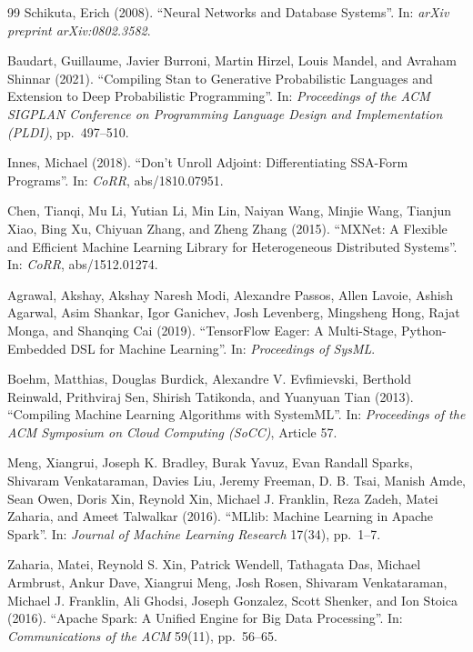 \documentclass[12pt]{report}
\begin{document}
\begin{thebibliography}{99}
Schikuta, Erich (2008).
``Neural Networks and Database Systems''.
In: \textit{arXiv preprint arXiv:0802.3582}.

Baudart, Guillaume, Javier Burroni, Martin Hirzel,
Louis Mandel, and Avraham Shinnar (2021).
``Compiling Stan to Generative Probabilistic Languages and Extension to Deep Probabilistic Programming''.
In: \textit{Proceedings of the ACM SIGPLAN Conference on Programming Language Design and Implementation (PLDI)},
pp.~497--510.

Innes, Michael (2018).
``Don't Unroll Adjoint: Differentiating SSA-Form Programs''.
In: \textit{CoRR}, abs/1810.07951.

Chen, Tianqi, Mu Li, Yutian Li, Min Lin,
Naiyan Wang, Minjie Wang, Tianjun Xiao,
Bing Xu, Chiyuan Zhang, and Zheng Zhang (2015).
``MXNet: A Flexible and Efficient Machine Learning Library for Heterogeneous Distributed Systems''.
In: \textit{CoRR}, abs/1512.01274.

Agrawal, Akshay, Akshay Naresh Modi,
Alexandre Passos, Allen Lavoie,
Ashish Agarwal, Asim Shankar,
Igor Ganichev, Josh Levenberg,
Mingsheng Hong, Rajat Monga,
and Shanqing Cai (2019).
``TensorFlow Eager: A Multi-Stage, Python-Embedded DSL for Machine Learning''.
In: \textit{Proceedings of SysML}.

Boehm, Matthias, Douglas Burdick,
Alexandre V. Evfimievski, Berthold Reinwald,
Prithviraj Sen, Shirish Tatikonda,
and Yuanyuan Tian (2013).
``Compiling Machine Learning Algorithms with SystemML''.
In: \textit{Proceedings of the ACM Symposium on Cloud Computing (SoCC)},
Article 57.

Meng, Xiangrui, Joseph K. Bradley, Burak Yavuz,
Evan Randall Sparks, Shivaram Venkataraman,
Davies Liu, Jeremy Freeman, D. B. Tsai,
Manish Amde, Sean Owen, Doris Xin,
Reynold Xin, Michael J. Franklin,
Reza Zadeh, Matei Zaharia, and Ameet Talwalkar (2016).
``MLlib: Machine Learning in Apache Spark''.
In: \textit{Journal of Machine Learning Research} 17(34),
pp.~1--7.

Zaharia, Matei, Reynold S. Xin, Patrick Wendell,
Tathagata Das, Michael Armbrust, Ankur Dave,
Xiangrui Meng, Josh Rosen, Shivaram Venkataraman,
Michael J. Franklin, Ali Ghodsi, Joseph Gonzalez,
Scott Shenker, and Ion Stoica (2016).
``Apache Spark: A Unified Engine for Big Data Processing''.
In: \textit{Communications of the ACM} 59(11),
pp.~56--65.



\end{thebibliography}
\end{document}
